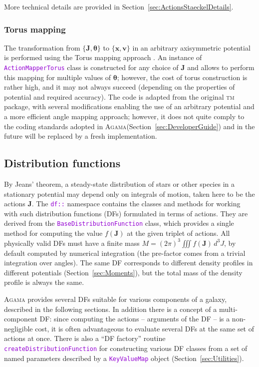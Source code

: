 \documentclass[12pt]{article}
\newcommand{\Agama}{\textsc{Agama}\xspace}
\newcommand{\ttt}[1]{\textcolor{darkviolet}{\texttt{#1}}}
\newcommand{\bv}{\boldsymbol{v}}
\newcommand{\bx}{\boldsymbol{x}}
\newcommand{\bJ}{\boldsymbol{J}}
\newcommand{\bt}{\boldsymbol{\theta}}
\begin{document}
More technical details are provided in Section~\ref{sec:ActionsStaeckelDetails}.

\subsubsection{Torus mapping}  \label{sec:ActionsTorus}

The transformation from $\{\bJ, \bt\}$ to $\{\bx,\bv\}$ in an arbitrary axisymmetric potential is performed using the Torus mapping approach \cite{BinneyMcMillan2016}. An instance of \ttt{ActionMapperTorus} class is constructed for any choice of $\bJ$ and allows to perform this mapping for multiple values of $\bt$; however, the cost of torus construction is rather high, and it may not always succeed (depending on the properties of potential and required accuracy). The code is adapted from the original \textsc{tm} package, with several modifications enabling the use of an arbitrary potential and a more efficient angle mapping approach; however, it does not quite comply to the coding standards adopted in \Agama (Section~\ref{sec:DeveloperGuide}) and in the future will be replaced by a fresh implementation. 


\subsection{Distribution functions}  \label{sec:DF}

By Jeans' theorem, a steady-state distribution of stars or other species in a stationary potential may depend only on integrals of motion, taken here to be the actions $\bJ$. The \ttt{df::} namespace contains the classes and methods for working with such distribution functions (DFs) formulated in terms of actions. They are derived from the \ttt{BaseDistributionFunction} class, which provides a single method for computing the value $f(\bJ)$ at the given triplet of actions. All physically valid DFs must have a finite mass $M = (2\pi)^3 \iiint f(\bJ)\,d^3J$, by default computed by numerical integration (the pre-factor comes from a trivial integration over angles).
The same DF corresponds to different density profiles in different potentials (Section~\ref{sec:Moments}), but the total mass of the density profile is always the same.

\Agama provides several DFs suitable for various components of a galaxy, described in the following sections. In addition there is a concept of a multi-component DF: since computing the actions -- arguments of the DF -- is a non-negligible cost, it is often advantageous to evaluate several DFs at the same set of actions at once.
There is also a ``DF factory'' routine \ttt{createDistributionFunction} for constructing various DF classes from a set of named parameters described by a \ttt{KeyValueMap} object (Section~\ref{sec:Utilities}).
\end{document}
